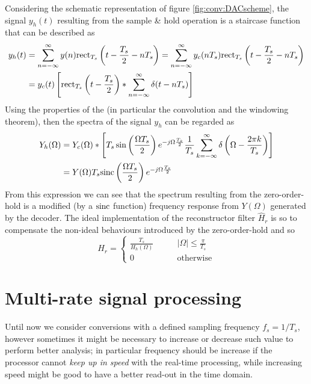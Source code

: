 	Considering the schematic representation of figure \ref{fig:conv:DACscheme}, the signal $y_h(t)$ resulting from the sample \& hold operation is a staircase function that can be described as
	\begin{align*}
		y_h(t) & = \sum_{n=-\infty}^\infty y(n) \textrm{rect}_{T_s} \left( t - \frac{T_s}2 - nT_s \right) = \sum_{n=-\infty}^\infty y_c (nT_s) \textrm{rect}_{T_s}\left( t - \frac {T_s} 2 - nT_s \right) \\
		& = y_c(t) \left[ \textrm{rect}_{T_s} \left( t - \frac{T_s}{2} \right) * \sum_{n=-\infty}^\infty \delta(t-nT_s) \right]
	\end{align*}
	Using the properties of the \ctft (in particular the convolution and the windowing theorem), then the spectra of the signal $y_h$ can be regarded as
	\begin{equation}
	\begin{aligned}
		Y_h(\Omega) & = Y_c(\Omega) * \left[ T_s \sin\left(\frac{\Omega T_s}{2}\right) e^{-j\Omega \frac{T_s}{2}}  \frac 1 {T_s} \sum_{k=-\infty}^\infty \delta\left( \Omega - \frac{2\pi k}{T_s} \right) \right] \\
		& = Y(\Omega) T_s \textrm{sinc} \left(\frac{\Omega T_s}{2}\right) e^{-j\Omega \frac{T_s}2}
	\end{aligned}
	\end{equation}
	From this expression we can see that the spectrum resulting from the zero-order-hold is a modified (by a $\textrm{sinc}$ function) frequency response from $Y(\Omega)$ generated by the decoder. The ideal implementation of the reconstructor filter $\hat H_r$ is so to compensate the non-ideal behaviours introduced by the zero-order-hold and so
	\begin{equation}
		\hat H_r = \begin{cases}
			\frac{T_s}{H_h(\Omega)} \qquad & |\Omega|\leq\frac{\pi}{T_s} \\ 0 & \textrm{otherwise}
		\end{cases}
	\end{equation}
	
	
	
\section{Multi-rate signal processing}
	
	Until now we consider conversions with a defined sampling frequency $f_s = 1 / T_s$, however sometimes it might be necessary to increase or decrease such value to perform better analysis; in particular frequency should be increase if the processor cannot \textit{keep up in speed} with the real-time processing, while increasing speed might be good to have a better read-out in the time domain.
	

